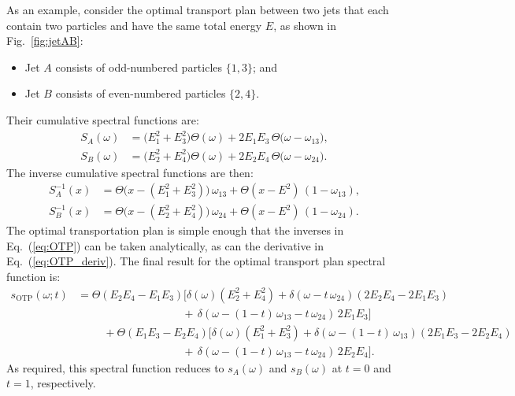 \documentclass[letterpaper,11pt]{article}
\DeclareRobustCommand{\Fig}[1]{Fig.~\ref{#1}}
\DeclareRobustCommand{\Eq}[1]{Eq.~(\ref{#1})}
\begin{document}
As an example, consider the optimal transport plan between two jets that each contain two particles and have the same total energy $E$, as shown in \Fig{fig:jetAB}:
%
\begin{itemize}
\item Jet $A$ consists of odd-numbered particles $\{1,3\}$; and
\item Jet $B$ consists of even-numbered particles $\{2,4\}$.
\end{itemize}
%
Their cumulative spectral functions are:
%
\begin{align}
%
\label{eq:2particle_1}
S_A(\omega) &= \big(E_1^2+E_3^2 \big) \Theta(\omega) + 2E_1E_3\,\Theta \big(\omega-\omega_{13} \big),\\
%
\label{eq:2particle_2}
S_B(\omega) &= \big(E_2^2+E_4^2\big) \Theta(\omega) + 2E_2E_4\,\Theta\big(\omega-\omega_{24}\big).
\end{align}
%
The inverse cumulative spectral functions are then:
%
\begin{align}
\label{eq:inv_cum_A}
S_A^{-1}(x) &= \Theta\big(x-(E_1^2+E_3^2)\big)\,\omega_{13}+\Theta(x-E^2)\,(1-\omega_{13}),\\
\label{eq:inv_cum_B}
S_B^{-1}(x) &= \Theta\big(x-(E_2^2+E_4^2) \big)\, \omega_{24} + \Theta(x-E^2)\, (1-\omega_{24}).
\end{align}
%
The optimal transportation plan is simple enough that the inverses in \Eq{eq:OTP} can be taken analytically, as can the derivative in \Eq{eq:OTP_deriv}.
%
The final result for the optimal transport plan spectral function is:
%
\begin{align}
s_\text{OTP}(\omega;t)&= \Theta(E_2 E_4-E_1 E_3)\Big[
\delta(\omega)(
E_2^2+E_4^2
)+\delta(
\omega-t\,\omega_{24}
)(
2E_2E_4-2E_1E_3
)\\
&
\hspace{4cm}+\,\delta(
\omega-(1-t)\, \omega_{13} -t\,\omega_{24}
)\,2E_1 E_3 \Big]\nonumber\\
&\hspace{1cm}
+\Theta(E_1 E_3-E_2 E_4)\Big[
\delta(\omega)(
E_1^2+E_3^2
)+\delta(
\omega-(1-t)\, \omega_{13}
)(
2E_1E_3-2E_2E_4
) \nonumber\\
&
\hspace{4cm}+\,\delta(
\omega-(1-t)\,\omega_{13}-t\,\omega_{24}
)\,2E_2E_4\Big].\nonumber
\end{align}
%
As required, this spectral function reduces to $s_A(\omega)$ and $s_B(\omega)$ at $t=0$ and $t=1$, respectively.
\end{document}
